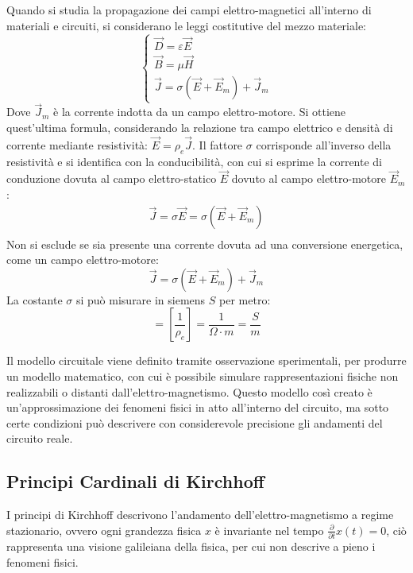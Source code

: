 \documentclass{article}
\numberwithin{equation}{subsection}
\begin{document}
Quando si studia la propagazione dei campi elettro-magnetici all'interno di materiali e circuiti, si considerano le leggi costitutive del mezzo materiale:
\begin{equation}
    \begin{cases}
        \vec{D}=\varepsilon\vec{E}\\
        \vec{B}=\mu\vec{H}\\
        \vec{J}=\sigma(\vec{E}+\vec{E}_m)+\vec{J}_m
    \end{cases}
\end{equation}
Dove $\vec{J}_m$ è la corrente indotta da un campo elettro-motore. Si ottiene quest'ultima formula, considerando la relazione tra campo elettrico e densità di corrente mediante 
resistività: $\vec{E}=\rho_e\vec{J}$. Il fattore $\sigma$ corrisponde all'inverso della resistività e si identifica con la conducibilità, con cui si esprime la corrente di conduzione dovuta al campo elettro-statico 
$\vec{E}$ dovuto al campo elettro-motore $\vec{E}_m$:  
\begin{gather*}
    \vec{J}=\sigma\vec{E}=\sigma(\vec{E}+\vec{E}_m)\\
\end{gather*}
Non si esclude se sia presente una corrente dovuta ad una conversione energetica, come un campo elettro-motore:
\begin{equation*}
    \vec{J}=\sigma(\vec{E}+\vec{E}_m)+\vec{J}_m
\end{equation*}
La costante $\sigma$ si può misurare in siemens $S$ per metro:
\begin{equation*}
    [\sigma]=\displaystyle\left[\frac{1}{\rho_e}\right]=\frac{1}{\Omega\cdot m}=\frac{S}{m}
\end{equation*}

Il modello circuitale viene definito tramite osservazione sperimentali, per produrre un modello matematico, con cui è possibile simulare rappresentazioni fisiche non realizzabili 
o distanti dall'elettro-magnetismo. Questo modello così creato è un'approssimazione dei fenomeni fisici in atto all'interno del circuito, ma sotto certe condizioni può 
descrivere con considerevole precisione gli andamenti del circuito reale. 

\subsection{Principi Cardinali di Kirchhoff}

I principi di Kirchhoff descrivono l'andamento dell'elettro-magnetismo a regime stazionario, ovvero ogni grandezza fisica $x$ è invariante nel tempo
$\displaystyle\frac{\partial }{\partial t}x(t)=0$, ciò rappresenta una visione galileiana della fisica, per cui non descrive a pieno i fenomeni fisici. 
\end{document}
